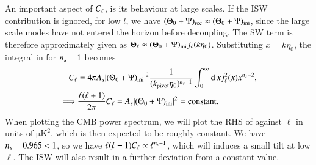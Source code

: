 An important aspect of $C_\ell$, is its behaviour at large scales. If the ISW contribution is ignored, for low $l$, we have $(\Theta_0 + \Psi)_\mathrm{rec}\approx(\Theta_0 + \Psi)_\mathrm{ini}$, since the large scale modes have not entered the horizon before decoupling. The SW term is therefore approximately given as $\Theta_\ell\approx (\Theta_0 + \Psi)_\mathrm{ini} j_\ell(k\eta_0)$. Substituting $x=k\eta_0$, the integral in  for $n_s=1$ becomes 
\begin{equation} \label{eq:M4:theory:C_ell_SW_plateau_integral}
    \begin{split}
        C_\ell &= 4\pi A_s \abs{(\Theta_0+\Psi)_\mathrm{ini}}^2 \frac{1}{(k_\mathrm{pivot} \eta_0)^{n_s-1}} \int_0^\infty \dd\, x j_\ell^2(x) x^{n_s-2}, \\
        \implies& \frac{\ell(\ell+1)}{2\pi}C_\ell = A_s \abs{(\Theta_0+\Psi)_\mathrm{ini}}^2 = \text{constant}.   
    \end{split}
\end{equation}
When plotting the CMB power spectrum, we will plot the RHS of  against $\ell$ in units of $\mathrm{\mu K^2}$, which is then expected to be roughly constant. We have $n_s=0.965<1$, so we have $\ell(\ell+1)C_\ell\propto \ell^{n_s-1}$, which will induces a small tilt at low $\ell$. The ISW will also result in a further deviation from a constant value. 


